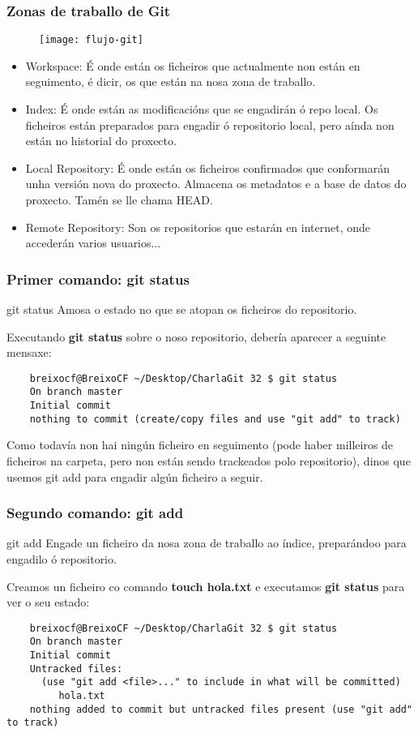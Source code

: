 \begin{frame}[fragile]
  \frametitle{Zonas de traballo de Git}
  \begin{multicols}{2}
    \begin{figure}
      \centering
      \texttt{[image: flujo-git]}
      \label{fig:flujo-git}
    \end{figure}
    \columnbreak
    \tiny
    \begin{itemize}
    \item Workspace: É onde están os ficheiros que actualmente non están en seguimento, é dicir, os que están na nosa zona de traballo.
    \item Index: É onde están as modificacións que se engadirán ó repo local. Os ficheiros están preparados para engadir ó repositorio local, pero aínda non están no historial do proxecto. 
    \item Local Repository: É onde están os ficheiros confirmados que conformarán unha versión nova do proxecto. Almacena os metadatos e a base de datos do proxecto. Tamén se lle chama HEAD.
    \item Remote Repository: Son os repositorios que estarán en internet, onde accederán varios usuarios...
    \end{itemize}
  \end{multicols}
\end{frame}

\begin{frame}[fragile]
  \frametitle{Primer comando: git status}
  \begin{block}{git status}
    Amosa o estado no que se atopan os ficheiros do repositorio.
  \end{block}
  Executando \textbf{git status} sobre o noso repositorio, debería aparecer a seguinte mensaxe:
  \tiny
\begin{verbatim}
	breixocf@BreixoCF ~/Desktop/CharlaGit 32 $ git status
	On branch master
	Initial commit
	nothing to commit (create/copy files and use "git add" to track)
\end{verbatim}
  \small Como todavía non hai ningún ficheiro en seguimento (pode haber milleiros de ficheiros na carpeta, pero non están sendo trackeados polo repositorio), dinos que usemos git add para engadir algún ficheiro a seguir.
\end{frame}

\begin{frame}[fragile]
  \frametitle{Segundo comando: git add}
  \begin{block}{git add}
    Engade un ficheiro da nosa zona de traballo ao índice, preparándoo para
    engadilo ó repositorio.
  \end{block}
  \small
  Creamos un ficheiro co comando \textbf{touch hola.txt} e executamos \textbf{git status} para ver o seu estado:
  \tiny
\begin{verbatim}
	breixocf@BreixoCF ~/Desktop/CharlaGit 32 $ git status
	On branch master
	Initial commit
	Untracked files:
	  (use "git add <file>..." to include in what will be committed)
	     hola.txt
	nothing added to commit but untracked files present (use "git add" to track)
\end{verbatim}
\end{frame}


